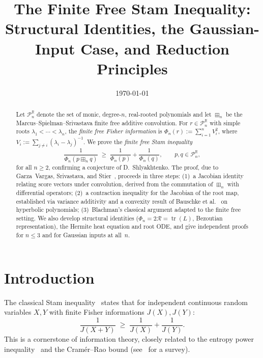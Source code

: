 \documentclass[10pt,a4paper]{amsart}
\theoremstyle{plain}
\theoremstyle{definition}
\theoremstyle{remark}
\newcommand{\R}{\mathbb{R}}
\newcommand{\PnR}[1][n]{\mathcal{P}^{\R}_{#1}}
\newcommand{\fp}{\boxplus_n}
\DeclareMathOperator{\tr}{tr}
\begin{document}
\title[The Finite Free Stam Inequality]%
{The Finite Free Stam Inequality:\\
Structural Identities, the Gaussian-Input Case,
and Reduction Principles}


\date{\today}

\begin{abstract}
Let $\PnR$ denote the set of monic, degree-$n$, real-rooted
polynomials and let $\fp$ be the Marcus--Spielman--Srivastava
finite free additive convolution.
For $r\in\PnR$ with simple roots
$\lambda_1<\cdots<\lambda_n$, the
\emph{finite free Fisher information} is
$\Phi_n(r):=\sum_{i=1}^n V_i^2$, where
$V_i:=\sum_{j\ne i}(\lambda_i-\lambda_j)^{-1}$.
We prove the \emph{finite free Stam inequality}
\[
  \frac{1}{\Phi_n(p\fp q)}\;\ge\;
  \frac{1}{\Phi_n(p)}+\frac{1}{\Phi_n(q)},
  \qquad p,q\in\PnR,
\]
for all $n\ge 2$, confirming a conjecture of D.~Shlyakhtenko.
The proof, due to Garza~Vargas, Srivastava, and
Stier~\cite{GVS}, proceeds in three steps:
(1)~a Jacobian identity relating score vectors under
convolution, derived from the commutation of $\fp$
with differential operators;
(2)~a contraction inequality for the Jacobian of the
root map, established via variance additivity and
a convexity result of Bauschke et al.~\cite{BGLS}
on hyperbolic polynomials;
(3)~Blachman's classical argument adapted to the
finite free setting.
We also develop structural identities
($\Phi_n=2\mathcal{R}=\tr(L)$, Bezoutian representation),
the Hermite heat equation and root ODE,
and give independent proofs for $n\le 3$ and
for Gaussian inputs at all~$n$.
\end{abstract}

\maketitle

\section{Introduction}
\label{sec:intro}

The classical Stam inequality~\cite{stam} states that
for independent continuous random variables $X,Y$ with
finite Fisher informations $J(X),J(Y)$:
\begin{equation}\label{eq:classical-stam}
  \frac{1}{J(X+Y)}\;\ge\;\frac{1}{J(X)}+\frac{1}{J(Y)}.
\end{equation}
This is a cornerstone of information theory, closely related
to the entropy power inequality~\cite{blachman} and the
Cram\'er--Rao bound (see~\cite{dembo} for a survey).
\end{document}
